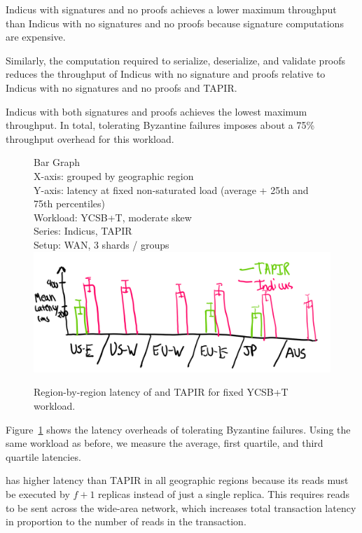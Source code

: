 Indicus with signatures and no proofs achieves a lower maximum throughput than
Indicus with no signatures and no proofs because signature computations are
expensive.

Similarly, the computation required to serialize, deserialize, and validate
proofs reduces the throughput of Indicus with no signature and proofs relative
to Indicus with no signatures and no proofs and TAPIR.

Indicus with both signatures and proofs achieves the lowest maximum throughput.
In total, tolerating Byzantine failures imposes about a 75\% throughput overhead
for this workload.

\begin{figure}
  Bar Graph\\
  X-axis: grouped by geographic region\\
  Y-axis: latency at fixed non-saturated load (average + 25th and 75th percentiles)\\
  Workload: YCSB+T, moderate skew\\
  Series: Indicus, TAPIR\\
  Setup: WAN, 3 shards / groups\\
  \includegraphics[width=\columnwidth]{figures/eval/bft-overhead-lat.png}
  \caption{Region-by-region latency of \sys{} and TAPIR for fixed YCSB+T workload.}
  \label{fig:bft-overhead-lat}
\end{figure}

Figure~\ref{fig:bft-overhead-lat} shows the latency overheads of tolerating
Byzantine failures. Using the same workload as before, we measure the average,
first quartile, and third quartile latencies. 

\sys{} has higher latency than TAPIR in all geographic regions because its
reads must be executed by $f+1$ replicas instead of just a single replica. This
requires reads to be sent across the wide-area network, which increases total
transaction latency in proportion to the number of reads in the transaction.


